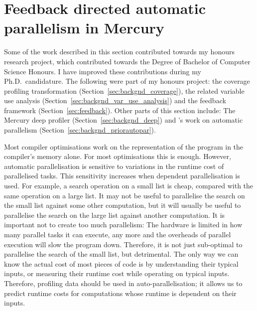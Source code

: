 
\section{Feedback directed automatic parallelism in Mercury}
\label{sec:backgnd_autopar}

Some of the work described in this section contributed towards my honours
research project,
which contributed towards 
the Degree of Bachelor of Computer Science Honours.
I have improved these contributions during my Ph.D.\
candidature.
The following were part of my honours project:
the coverage profiling transformation (Section~\ref{sec:backgnd_coverage}),
the related variable use analysis (Section~\ref{sec:backgnd_var_use_analysis})
and the feedback framework (Section~\ref{sec:feedback}).
Other parts of this section include:
The Mercury deep profiler \citep{conway:2001:mercury-deep}
(Section~\ref{sec:backgnd_deep}) and
\citet*{tannier:2007:parallel_mercury}'s work on automatic parallelism
(Section~\ref{sec:backgnd_priorautopar}).

Most compiler optimisations work on the representation of the program in
the compiler's memory alone.
For most optimisations this is enough.
However,
automatic parallelisation is sensitive to variations in the runtime cost of
parallelised tasks.
This sensitivity increases when dependent parallelisation is used.
For example,
a search operation on a small list is cheap, compared with the same operation on
a large list.
It may not be useful to parallelise the search on the small list against some
other computation,
but it will usually be useful to parallelise the search on the large list
against another computation.
It is important not to create too much parallelism:
The hardware is limited in how many parallel tasks it can execute,
any more and the overheads of parallel execution will slow the program down.
Therefore, it is not just sub-optimal to parallelise the search of the small list,
but detrimental.
The only way we can know the actual cost of most pieces of code
is by understanding their typical inputs,
or measuring their runtime cost while operating on typical inputs.
Therefore,
profiling data should be used in auto-parallelisation;
it allows us to predict runtime costs for computations whose
runtime is dependent on their inputs.

